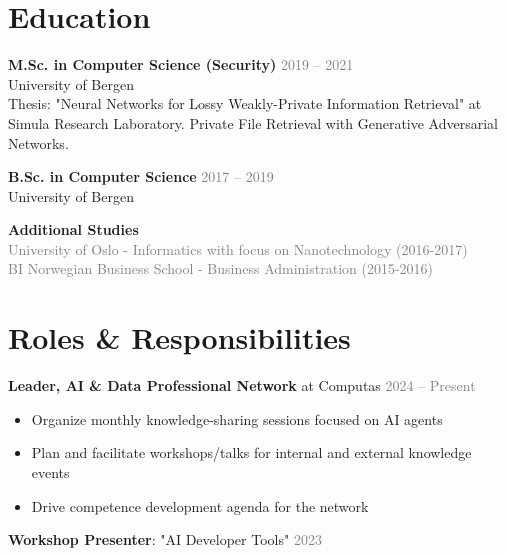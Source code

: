 \documentclass[11pt,a4paper]{article}
\begin{document}
\vspace{10pt}

\section{Education}

\textbf{M.Sc. in Computer Science (Security)} \hfill \textcolor{gray}{2019 – 2021}\\
University of Bergen\\
Thesis: "Neural Networks for
Lossy Weakly-Private Information Retrieval" at Simula Research Laboratory. Private File Retrieval with Generative Adversarial Networks.

\vspace{10pt}

\textbf{B.Sc. in Computer Science} \hfill \textcolor{gray}{2017 – 2019}\\
University of Bergen

\vspace{10pt}

\textbf{Additional Studies}\\
\textcolor{gray}{University of Oslo - Informatics with focus on Nanotechnology (2016-2017)}\\
\textcolor{gray}{BI Norwegian Business School - Business Administration (2015-2016)}

\vspace{10pt}

\section{Roles \& Responsibilities}

\textbf{Leader, AI \& Data Professional Network} at Computas \hfill \textcolor{gray}{2024 – Present}
\begin{itemize}[itemsep=0.3em, leftmargin=*]
\item Organize monthly knowledge-sharing sessions focused on AI agents
\item Plan and facilitate workshops/talks for internal and external knowledge events
\item Drive competence development agenda for the network
\end{itemize}

\textbf{Workshop Presenter}: "AI Developer Tools" \hfill \textcolor{gray}{2023}

\vspace{10pt}
\end{document}
